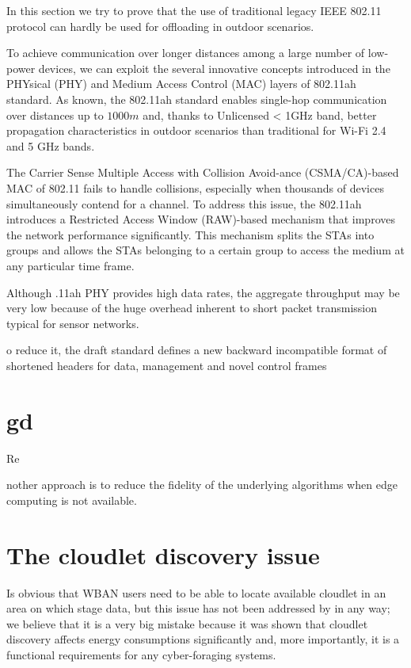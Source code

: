 \documentclass[sigchi]{acmart}
\begin{document}
In this section we try to prove that the use of traditional legacy IEEE 802.11 protocol can hardly be used for offloading in outdoor scenarios.

To achieve communication over longer distances among a large number of low-power devices, we can exploit the several innovative concepts introduced in the PHYsical (PHY) and Medium Access Control (MAC) layers of 802.11ah standard. As known, the 802.11ah standard enables single-hop communication over distances up to $1000 m$ and, thanks to Unlicensed < 1GHz band, better propagation characteristics in outdoor scenarios than traditional for Wi-Fi 2.4 and 5 GHz bands.

The Carrier Sense Multiple Access with Collision Avoid-ance (CSMA/CA)-based MAC of 802.11 fails to handle collisions, especially when thousands of devices simultaneously contend for a channel. To address this issue, the 802.11ah introduces a Restricted Access Window (RAW)-based mechanism that improves the network performance significantly. This mechanism splits the STAs into groups and allows the STAs belonging to a certain group to access the medium at any particular time frame.

Although .11ah PHY provides high data rates, the aggregate throughput may be very low because of the huge overhead inherent to short packet transmission typical for sensor networks.

o reduce it, the draft standard defines a new backward incompatible
format of shortened headers for data, management and novel control frames








\section{gd}

Re










nother approach is to reduce the
ﬁdelity of the underlying algorithms when edge computing is
not available.


\section{The cloudlet discovery issue}

Is obvious that WBAN users need to be able to locate available cloudlet in an area on which stage data, but this issue has not been addressed by \citet{MSAReport} in any way; we believe that it is a very big mistake because it was shown that cloudlet discovery affects energy consumptions significantly and, more importantly, it is a functional requirements for any cyber-foraging systems.
\end{document}
